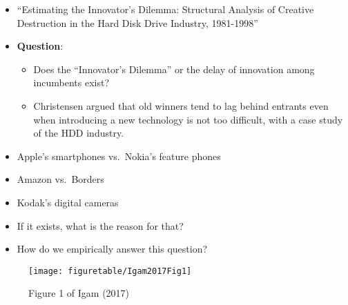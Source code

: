 \documentclass[
]{book}
\providecommand{\tightlist}{%
  \setlength{\itemsep}{0pt}\setlength{\parskip}{0pt}}
\begin{document}
\begin{itemize}
\item
  \citet{Igami2017} ``Estimating the Innovator's Dilemma: Structural Analysis of Creative Destruction in the Hard Disk Drive Industry, 1981-1998''
\item
  \textbf{Question}:

  \begin{itemize}
  \tightlist
  \item
    Does the ``Innovator's Dilemma'' \citep{Christensen1997} or the delay of innovation among incumbents exist?
  \item
    Christensen argued that old winners tend to lag behind entrants even when introducing a new technology is not too difficult, with a case study of the HDD industry.
  \end{itemize}
\item
  Apple's smartphones vs.~Nokia's feature phones
\item
  Amazon vs.~Borders
\item
  Kodak's digital cameras
\item
  If it exists, what is the reason for that?
\item
  How do we empirically answer this question?
\end{itemize}

\begin{figure}

{\centering \texttt{[image: figuretable/Igam2017Fig1]} 

}

\caption{Figure 1 of Igam (2017)}\label{fig:unnamed-chunk-2}
\end{figure}
\end{document}

